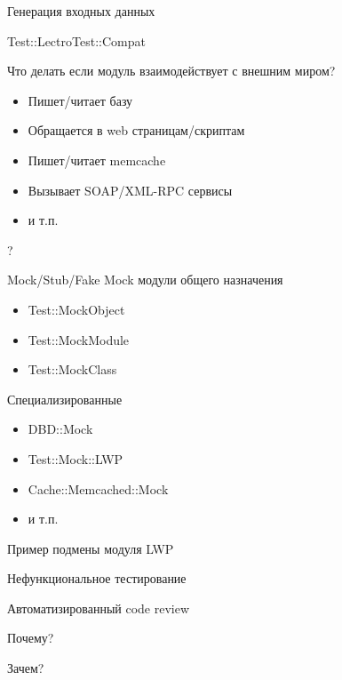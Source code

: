 \documentclass{beamer}
\begin{document}
\begin{frame}{Генерация входных данных}
\begin{block}{Test::LectroTest::Compat}

\end{block}
\end{frame}

\begin{frame}{Что делать если модуль взаимодействует с внешним миром?}
\begin{itemize}
\item Пишет/читает базу
\item Обращается в web страницам/скриптам
\item Пишет/читает memcache
\item Вызывает SOAP/XML-RPC сервисы
\item и т.п.
\end{itemize}
\begin{center} 
\LARGE ?
\end{center}
\end{frame}

\begin{frame}{Mock/Stub/Fake}
Mock модули общего назначения
\begin{itemize}
\item Test::MockObject
\item Test::MockModule
\item Test::MockClass
\end{itemize}
Специализированные
\begin{itemize}
\item DBD::Mock
\item Test::Mock::LWP
\item Cache::Memcached::Mock
\item и т.п.
\end{itemize}
\end{frame}

\begin{frame}[allowframebreaks]{Пример подмены модуля LWP}

\end{frame}

\begin{frame}{}
\begin{center}
Нефункциональное тестирование

Автоматизированный code review

Почему?

Зачем?

\end{center}
\end{frame}
\end{document}
